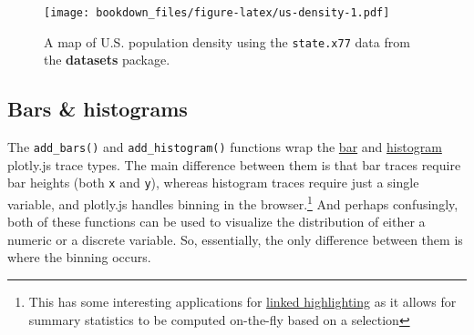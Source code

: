 \documentclass[12pt,]{isuthesis}
\newenvironment{Shaded}{\begin{snugshade}}{\end{snugshade}}
\newcommand{\KeywordTok}[1]{\textcolor[rgb]{0.13,0.29,0.53}{\textbf{{#1}}}}
\newcommand{\DataTypeTok}[1]{\textcolor[rgb]{0.13,0.29,0.53}{{#1}}}
\newcommand{\DecValTok}[1]{\textcolor[rgb]{0.00,0.00,0.81}{{#1}}}
\newcommand{\StringTok}[1]{\textcolor[rgb]{0.31,0.60,0.02}{{#1}}}
\newcommand{\NormalTok}[1]{{#1}}
\let\rmarkdownfootnote\footnote%
\def\footnote{\protect\rmarkdownfootnote}
\begin{document}
\begin{Shaded}
\end{Shaded}

\begin{figure}[htbp]
\centering
\texttt{[image: bookdown\_files/figure-latex/us-density-1.pdf]}
\caption{\label{fig:us-density}A map of U.S. population density using the
\texttt{state.x77} data from the \textbf{datasets} package.}
\end{figure}

\hypertarget{bars-histograms}{\subsection{Bars \&
histograms}\label{bars-histograms}}

The \texttt{add\_bars()} and \texttt{add\_histogram()} functions wrap
the \href{https://plot.ly/r/reference/\#bar}{bar} and
\href{https://plot.ly/r/reference/\#histogram}{histogram} plotly.js
trace types. The main difference between them is that bar traces require
bar heights (both \texttt{x} and \texttt{y}), whereas histogram traces
require just a single variable, and plotly.js handles binning in the
browser.\footnote{This has some interesting applications for
  \protect\hyperlink{linked-highlighting}{linked highlighting} as it
  allows for summary statistics to be computed on-the-fly based on a
  selection} And perhaps confusingly, both of these functions can be
used to visualize the distribution of either a numeric or a discrete
variable. So, essentially, the only difference between them is where the
binning occurs.
\end{document}
